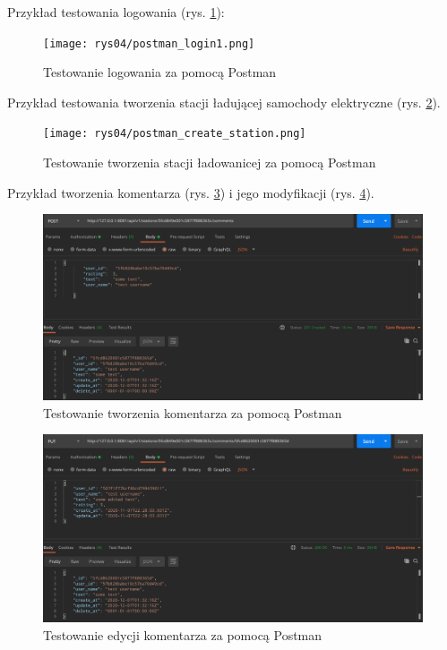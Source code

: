 Przykład testowania logowania (rys. \ref{fig:postman_login1}):
\begin{figure}[ht]
    \centering
        \texttt{[image: rys04/postman\_login1.png]}
        \caption{Testowanie logowania za pomocą Postman}
    \label{fig:postman_login1}
\end{figure}

Przykład testowania tworzenia stacji ładującej samochody elektryczne (rys. \ref{fig:postman_create_station}).
\begin{figure}[ht]
    \centering
        \texttt{[image: rys04/postman\_create\_station.png]}
        \caption{Testowanie tworzenia stacji ładowanicej za pomocą Postman}
    \label{fig:postman_create_station}
\end{figure}
\newpage
Przykład tworzenia komentarza (rys. \ref{fig:postman_create_comment}) i jego modyfikacji (rys. \ref{fig:postman_edit_comment}).
\begin{figure}[ht]
    \centering
        \includegraphics[width=0.9\linewidth]{rys04/postman_create_comment.png}
        \caption{Testowanie tworzenia komentarza za pomocą Postman}
    \label{fig:postman_create_comment}
\end{figure}
\begin{figure}[ht]
    \centering
        \includegraphics[width=0.9\linewidth]{rys04/postman_edit_comment.png}
        \caption{Testowanie edycji komentarza za pomocą Postman}
    \label{fig:postman_edit_comment}
\end{figure}
